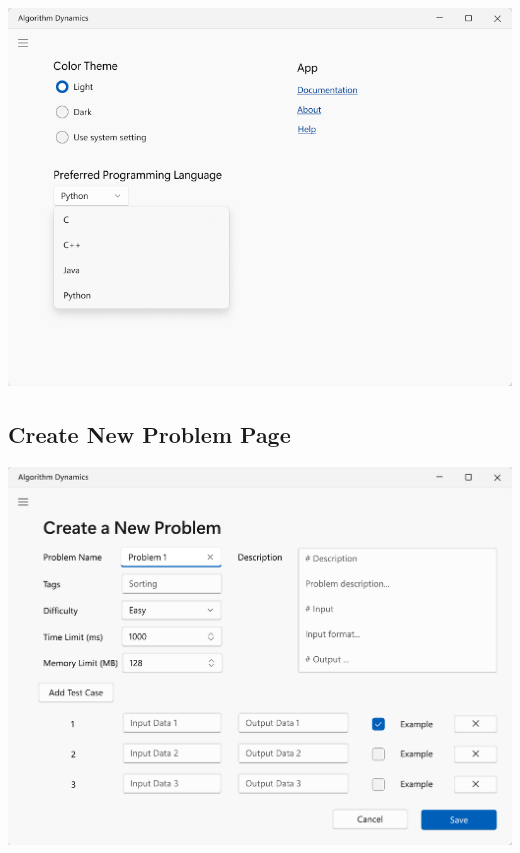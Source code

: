 \documentclass[a4paper]{report}
\begin{document}
\includegraphics[width=\textwidth, height=\textheight, keepaspectratio]{SettingsPage-Design}

\subsection{Create New Problem Page}

\includegraphics[width=\textwidth, height=\textheight, keepaspectratio]{CreateNewProblemPage-Design}
\end{document}
